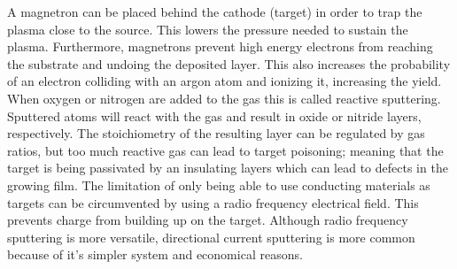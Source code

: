 A magnetron can be placed behind the cathode (target) in order to trap the plasma close to the source. 
This lowers the pressure needed to sustain the plasma. 
Furthermore, magnetrons prevent high energy electrons from reaching the substrate and 
undoing the deposited layer.
This also increases the probability of an electron 
colliding with an argon atom and ionizing it, increasing the yield.
%
When oxygen or nitrogen are added to the gas this is called reactive sputtering.
Sputtered atoms will react with the gas and result in oxide or nitride layers, respectively.
The stoichiometry of the resulting layer can be regulated by gas ratios, but too much reactive gas can lead to target poisoning;
meaning that the target is being passivated by an insulating layers which can lead to defects in the growing film\cite{Kelly2000}. 
%
The limitation of only being able to use conducting materials as targets can be circumvented by using a radio frequency electrical field. 
This prevents charge from building up on the target. \linebreak[2]
Although radio frequency sputtering is more versatile, directional current sputtering is more common because of it's simpler system and economical reasons.

\pagebreak[4]
